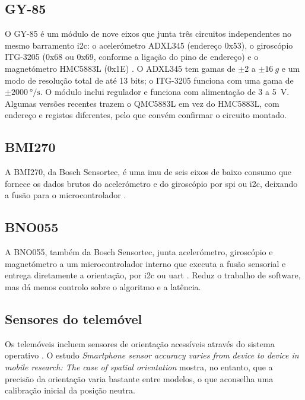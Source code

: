 \subsection{GY-85}
O GY-85 é um módulo de nove eixos que junta três circuitos independentes no mesmo barramento \gls{i2c}: o acelerómetro ADXL345 (endereço 0x53), o giroscópio ITG-3205 (0x68 ou 0x69, conforme a ligação do pino de endereço) e o magnetómetro HMC5883L (0x1E) \cite{gy85,gy85datasheet}. O ADXL345 tem gamas de $\pm2$ a $\pm\SI{16}{g}$ e um modo de resolução total de até 13 bits; o ITG-3205 funciona com uma gama de $\pm\SI{2000}{\degree\per\second}$. O módulo inclui regulador e funciona com alimentação de 3 a \SI{5}{\volt}. Algumas versões recentes trazem o QMC5883L em vez do HMC5883L, com endereço e registos diferentes, pelo que convém confirmar o circuito montado.

\subsection{BMI270}
A BMI270, da Bosch Sensortec, é uma \gls{imu} de seis eixos de baixo consumo que fornece os dados brutos do acelerómetro e do giroscópio por \gls{spi} ou \gls{i2c}, deixando a fusão para o microcontrolador \cite{bmi270}.

\subsection{BNO055}
A BNO055, também da Bosch Sensortec, junta acelerómetro, giroscópio e magnetómetro a um microcontrolador interno que executa a fusão sensorial e entrega diretamente a orientação, por \gls{i2c} ou \gls{uart} \cite{bno055}. Reduz o trabalho de software, mas dá menos controlo sobre o algoritmo e a latência.

\subsection{Sensores do telemóvel}
Os telemóveis incluem sensores de orientação acessíveis através do sistema operativo \cite{android}. O estudo \textit{Smartphone sensor accuracy varies from device to device in mobile research: The case of spatial orientation} \cite{kuhlmann2021} mostra, no entanto, que a precisão da orientação varia bastante entre modelos, o que aconselha uma calibração inicial da posição neutra.

